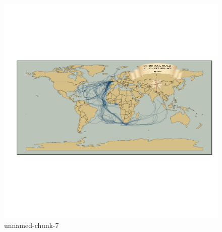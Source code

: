 \documentclass[]{article}
\makeatletter
\def\maxwidth{\ifdim\Gin@nat@width>\linewidth\linewidth
\else\Gin@nat@width\fi}
\let\Oldincludegraphics\includegraphics
\renewcommand{\includegraphics}[1]{\Oldincludegraphics[width=\maxwidth]{#1}}
\makeatother
\begin{document}
\begin{figure}[htbp]
\centering
\includegraphics{figure/unnamed-chunk-7.png}
\caption{unnamed-chunk-7}
\end{figure}
\end{document}
